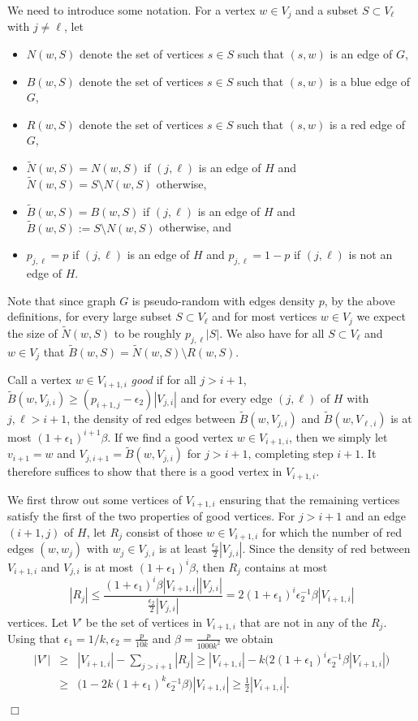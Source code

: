 \documentclass[11pt]{article}
\newenvironment{proof}
      {\medskip\noindent{\bf Proof.}\hspace{1mm}}
      {\hfill$\Box$\medskip}
\begin{document}
\begin{proof}
We need to introduce some notation. For a vertex $w \in V_j$ and a
subset $S \subset V_{\ell}$ with $j \not =\ell$, let
\begin{itemize}
\item $N(w,S)$ denote the set of vertices $s \in S$ such that $(s,w)$ is an edge of
$G$,
\item $B(w,S)$ denote the set of vertices $s \in S$ such that $(s,w)$ is a
blue edge of $G$,
\item $R(w,S)$ denote the set of vertices $s \in S$ such that $(s,w)$ is a
red edge of $G$,
\item $\tilde{N}(w,S)=N(w,S)$ if $(j, \ell)$ is an edge of $H$ and $\tilde{N}(w,S)=S
\setminus N(w,S)$ otherwise,
\item $\tilde{B}(w,S)=B(w,S)$ if $(j, \ell)$ is an edge of $H$ and $\tilde{B}(w,S):=S
\setminus N(w,S)$ otherwise, and
\item
$p_{j,\ell}=p$ if $(j,\ell)$ is an edge of $H$ and
$p_{j,\ell}=1-p$ if $(j,\ell)$ is not an edge of $H$.
\end{itemize}
Note that since graph $G$ is pseudo-random with edges density $p$, by the above definitions,
for every large subset $S \subset V_{\ell}$ and for most vertices $w \in V_j$ we expect
the size of $\tilde{N}(w,S)$ to be roughly  $p_{j,\ell}|S|$. We also have for
all $S \subset V_{\ell}$ and $w \in V_j$ that
$\tilde{B}(w,S)=\tilde{N}(w,S) \setminus R(w,S)$.

Call a vertex $w \in V_{i+1,i}$ {\it good} if for all $j >i+1$,
$\tilde{B}(w,V_{j,i})\geq (p_{i+1,j}-\epsilon_2)|V_{j,i}|$ and
for every edge $(j,\ell)$ of $H$ with $j, \ell>i+1$,
the density of red edges between $\tilde{B}(w,V_{j,i})$ and $\tilde{B}(w,V_{\ell,i})$ is at most
$(1+\epsilon_1)^{i+1}\beta$. If we find a good vertex $w \in V_{i+1,i}$, then we simply let
$v_{i+1}=w$ and $V_{j,i+1}=\tilde{B}(w,V_{j,i})$ for $j > i+1$,
completing step $i+1$. It therefore suffices to show that there is a
good vertex in $V_{i+1,i}$.

We first throw out some vertices of $V_{i+1,i}$ ensuring that the
remaining vertices satisfy the first of the two properties of good
vertices. For $j >i+1$ and an edge $(i+1,j)$ of $H$, let
$R_{j}$ consist of those $w \in V_{i+1,i}$ for which the
number of red edges $(w,w_j)$ with $w_j \in V_{j,i}$ is at least
$\frac{\epsilon_2}{2}|V_{j,i}|$. Since the density of red between
$V_{i+1,i}$ and $V_{j,i}$ is at most $(1+\epsilon_1)^i\beta$, then
$R_{j}$ contains at most
$$|R_{j}| \leq \frac{(1+\epsilon_1)^i\beta|V_{i+1,i}||V_{j,i}|}{\frac{\epsilon_2}{2}|V_{j,i}|}=2(1+\epsilon_1)^i\epsilon_2^{-1}\beta|V_{i+1,i}|$$
vertices. Let $V'$ be the set of vertices in $V_{i+1,i}$ that are not in
any of the $R_j$. Using that $\epsilon_1=1/k, \epsilon_2=\frac{p}{10k}$ and $
\beta=\frac{p}{1000k^2}$ we obtain
\begin{eqnarray*}
|V'| &\geq& |V_{i+1,i}|-\sum_{j>i+1}|R_j| \geq |V_{i+1,i}|-k\Big(2(1+\epsilon_1)^i\epsilon_2^{-1}\beta|V_{i+1,i}|\Big)\\
&\geq&
\Big(1-2k(1+\epsilon_1)^k\epsilon_2^{-1}\beta\Big)|V_{i+1,i}|
\geq \frac{1}{2}|V_{i+1,i}|.
\end{eqnarray*}


\end{proof}
\end{document}
